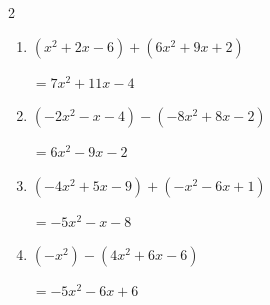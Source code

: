 \begin{multicols}{2}
\begin{enumerate}
  \item $(x^{2}+2x-6)+(6x^{2}+9x+2)$

        $=7x^{2}+11x-4$

  \item $(-2x^{2}-x-4)-(-8x^{2}+8x-2)$

        $=6x^{2}-9x-2$

  \item $(-4x^{2}+5x-9)+(-x^{2}-6x+1)$

        $=-5x^{2}-x-8$

  \item $(-x^{2})-(4x^{2}+6x-6)$

        $=-5x^{2}-6x+6$

\end{enumerate}
\end{multicols}
